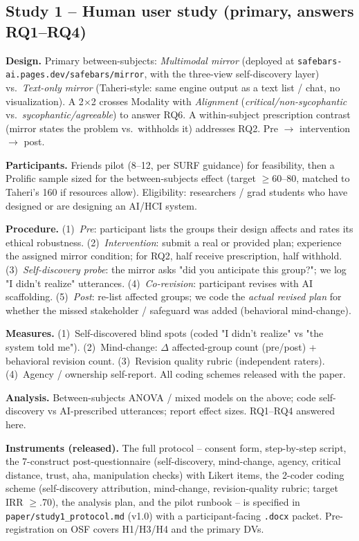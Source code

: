 \documentclass[manuscript,screen]{acmart}
\begin{document}
\subsection{Study 1 -- Human user study (primary, answers RQ1--RQ4)}
\noindent\textbf{Design.} Primary between-subjects: \emph{Multimodal mirror} (deployed at
\texttt{safebars-ai.pages.dev/safebars/mirror}, with the three-view self-discovery
layer) vs.\ \emph{Text-only mirror} (Taheri-style: same engine output as a text list /
chat, no visualization). A 2$\times$2 crosses Modality with \emph{Alignment}
(\emph{critical/non-sycophantic} vs.\ \emph{sycophantic/agreeable}) to answer RQ6. A
within-subject prescription contrast (mirror states the problem vs.\ withholds it)
addresses RQ2. Pre $\to$ intervention $\to$ post.

\noindent\textbf{Participants.} Friends pilot (8--12, per SURF guidance) for
feasibility, then a Prolific sample sized for the between-subjects effect (target
$\ge$60--80, matched to Taheri's 160 if resources allow). Eligibility: researchers /
grad students who have designed or are designing an AI/HCI system.

\noindent\textbf{Procedure.} (1)~\emph{Pre}: participant lists the groups their design
affects and rates its ethical robustness. (2)~\emph{Intervention}: submit a real or
provided plan; experience the assigned mirror condition; for RQ2, half receive
prescription, half withhold. (3)~\emph{Self-discovery probe}: the mirror asks "did you
anticipate this group?"; we log "I didn't realize" utterances. (4)~\emph{Co-revision}:
participant revises with AI scaffolding. (5)~\emph{Post}: re-list affected groups; we
code the \emph{actual revised plan} for whether the missed stakeholder / safeguard was
added (behavioral mind-change).

\noindent\textbf{Measures.} (1)~Self-discovered blind spots (coded "I didn't realize"
vs "the system told me"). (2)~Mind-change: $\Delta$ affected-group count (pre/post) +
behavioral revision count. (3)~Revision quality rubric (independent raters).
(4)~Agency / ownership self-report. All coding schemes released with the paper.

\noindent\textbf{Analysis.} Between-subjects ANOVA / mixed models on the above; code
self-discovery vs AI-prescribed utterances; report effect sizes. RQ1--RQ4 answered here.

\noindent\textbf{Instruments (released).} The full protocol -- consent form, step-by-step
script, the 7-construct post-questionnaire (self-discovery, mind-change, agency, critical
distance, trust, aha, manipulation checks) with Likert items, the 2-coder coding scheme
(self-discovery attribution, mind-change, revision-quality rubric; target IRR $\ge$.70), the
analysis plan, and the pilot runbook -- is specified in \texttt{paper/study1\_protocol.md}
(v1.0) with a participant-facing \texttt{.docx} packet. Pre-registration on OSF covers
H1/H3/H4 and the primary DVs.
\end{document}
